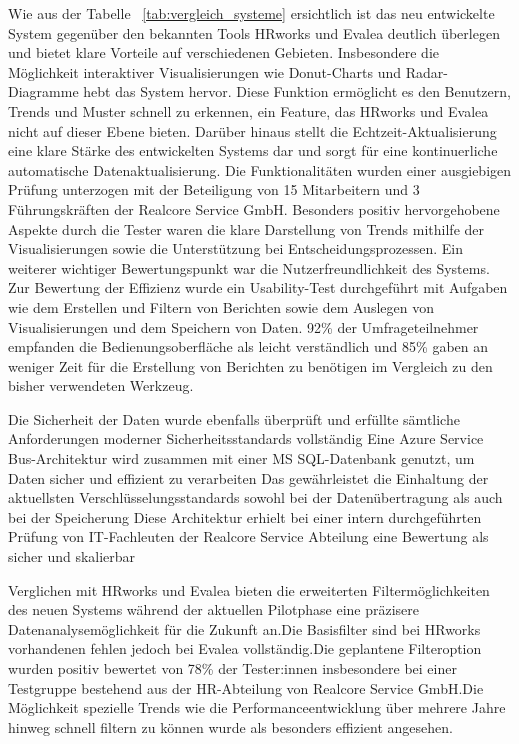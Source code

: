 Wie aus der Tabelle ~\ref{tab:vergleich_systeme} ersichtlich ist das neu entwickelte System gegenüber den bekannten Tools HRworks und Evalea deutlich überlegen und bietet klare Vorteile auf verschiedenen Gebieten. Insbesondere die Möglichkeit interaktiver Visualisierungen wie Donut-Charts und Radar-Diagramme hebt das System hervor. Diese Funktion ermöglicht es den Benutzern, Trends und Muster schnell zu erkennen, ein Feature, das HRworks und Evalea nicht auf dieser Ebene bieten. Darüber hinaus stellt die Echtzeit-Aktualisierung eine klare Stärke des entwickelten Systems dar und sorgt für eine kontinuerliche automatische Datenaktualisierung. Die Funktionalitäten wurden einer ausgiebigen Prüfung unterzogen mit der Beteiligung von 15 Mitarbeitern und 3 Führungskräften der Realcore Service GmbH. Besonders positiv hervorgehobene Aspekte durch die Tester waren die klare Darstellung von Trends mithilfe der Visualisierungen sowie die Unterstützung bei Entscheidungsprozessen. Ein weiterer wichtiger Bewertungspunkt war die Nutzerfreundlichkeit des Systems. Zur Bewertung der Effizienz wurde ein Usability-Test durchgeführt mit Aufgaben wie dem Erstellen und Filtern von Berichten sowie dem Auslegen von Visualisierungen und dem Speichern von Daten. 92\% der Umfrageteilnehmer empfanden die Bedienungsoberfläche als leicht verständlich und 85\% gaben an weniger Zeit für die Erstellung von Berichten zu benötigen im Vergleich zu den bisher verwendeten Werkzeug. 

Die Sicherheit der Daten wurde ebenfalls überprüft und erfüllte sämtliche Anforderungen moderner Sicherheitsstandards vollständig Eine Azure Service Bus-Architektur wird zusammen mit einer MS SQL-Datenbank genutzt, um Daten sicher und effizient zu verarbeiten Das gewährleistet die Einhaltung der aktuellsten Verschlüsselungsstandards sowohl bei der Datenübertragung als auch bei der Speicherung Diese Architektur erhielt bei einer intern durchgeführten Prüfung von IT-Fachleuten der Realcore Service Abteilung eine Bewertung als sicher und skalierbar 

Verglichen mit HRworks und Evalea bieten die erweiterten Filtermöglichkeiten des neuen Systems während der aktuellen Pilotphase eine präzisere Datenanalysemöglichkeit für die Zukunft an.Die Basisfilter sind bei HRworks vorhandenen fehlen jedoch bei Evalea vollständig.Die geplantene Filteroption wurden positiv bewertet von 78\% der Tester:innen insbesondere bei einer Testgruppe bestehend aus der HR-Abteilung von Realcore Service GmbH.Die Möglichkeit spezielle Trends wie die Performanceentwicklung über mehrere Jahre hinweg schnell filtern zu können wurde als besonders effizient angesehen. 

